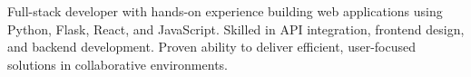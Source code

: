 
\begin{cvparagraph}
Full-stack developer with hands-on experience building web applications using Python, Flask, React, and JavaScript. Skilled in API integration, frontend design, and backend development. Proven ability to deliver efficient, user-focused solutions in collaborative environments.
\end{cvparagraph}

